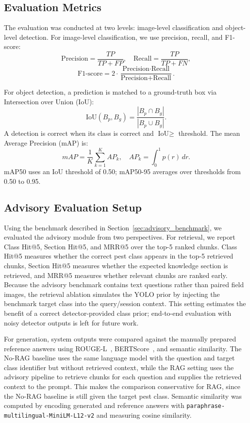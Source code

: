 ﻿\documentclass[11pt]{article}
\begin{document}
\subsection{Evaluation Metrics}

The evaluation was conducted at two levels: image-level classification and object-level detection. For image-level classification, we use precision, recall, and F1-score:
\[
\text{Precision} = \frac{TP}{TP + FP}, \quad \text{Recall} = \frac{TP}{TP + FN},
\]
\[
\text{F1-score} = 2 \cdot \frac{\text{Precision} \cdot \text{Recall}}{\text{Precision} + \text{Recall}}.
\]

For object detection, a prediction is matched to a ground-truth box via Intersection over Union (IoU):
\[
\text{IoU}(B_p, B_g) = \frac{|B_p \cap B_g|}{|B_p \cup B_g|}.
\]
A detection is correct when its class is correct and $\text{IoU} \geq$ threshold. The mean Average Precision (mAP) is:
\[
mAP = \frac{1}{K}\sum_{k=1}^{K} AP_k, \quad AP_k = \int_{0}^{1} p(r)\,dr.
\]
mAP50 uses an IoU threshold of 0.50; mAP50-95 averages over thresholds from 0.50 to 0.95.

\subsection{Advisory Evaluation Setup}

Using the benchmark described in Section~\ref{sec:advisory_benchmark}, we evaluated the advisory module from two perspectives. For retrieval, we report Class Hit@5, Section Hit@5, and MRR@5 over the top-5 ranked chunks. Class Hit@5 measures whether the correct pest class appears in the top-5 retrieved chunks, Section Hit@5 measures whether the expected knowledge section is retrieved, and MRR@5 measures whether relevant chunks are ranked early. Because the advisory benchmark contains text questions rather than paired field images, the retrieval ablation simulates the YOLO prior by injecting the benchmark target class into the query/session context. This setting estimates the benefit of a correct detector-provided class prior; end-to-end evaluation with noisy detector outputs is left for future work.

For generation, system outputs were compared against the manually prepared reference answers using ROUGE-L~\citep{lin2004rouge}, BERTScore~\citep{zhang2020bertscore}, and semantic similarity. The No-RAG baseline uses the same language model with the question and target class identifier but without retrieved context, while the RAG setting uses the advisory pipeline to retrieve chunks for each question and supplies the retrieved context to the prompt. This makes the comparison conservative for RAG, since the No-RAG baseline is still given the target pest class. Semantic similarity was computed by encoding generated and reference answers with \texttt{paraphrase-multilingual-MiniLM-L12-v2} and measuring cosine similarity.
\end{document}
